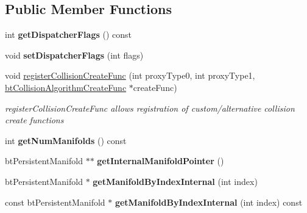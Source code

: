 \subsection*{Public Member Functions}
\begin{DoxyCompactItemize}
\item 
\hypertarget{classbt_collision_dispatcher_a9f91e83776324e63444f32c8907d8270}{int {\bfseries get\+Dispatcher\+Flags} () const }\label{classbt_collision_dispatcher_a9f91e83776324e63444f32c8907d8270}

\item 
\hypertarget{classbt_collision_dispatcher_acf7d7afab71d8ffb37e8c3ed8613eebe}{void {\bfseries set\+Dispatcher\+Flags} (int flags)}\label{classbt_collision_dispatcher_acf7d7afab71d8ffb37e8c3ed8613eebe}

\item 
\hypertarget{classbt_collision_dispatcher_ac754ecadc2116cdf75d63c207937aeac}{void \hyperlink{classbt_collision_dispatcher_ac754ecadc2116cdf75d63c207937aeac}{register\+Collision\+Create\+Func} (int proxy\+Type0, int proxy\+Type1, \hyperlink{structbt_collision_algorithm_create_func}{bt\+Collision\+Algorithm\+Create\+Func} $\ast$create\+Func)}\label{classbt_collision_dispatcher_ac754ecadc2116cdf75d63c207937aeac}

\begin{DoxyCompactList}\small\item\em register\+Collision\+Create\+Func allows registration of custom/alternative collision create functions \end{DoxyCompactList}\item 
\hypertarget{classbt_collision_dispatcher_a565cb90e159a6a47d560e4212e279173}{int {\bfseries get\+Num\+Manifolds} () const }\label{classbt_collision_dispatcher_a565cb90e159a6a47d560e4212e279173}

\item 
\hypertarget{classbt_collision_dispatcher_a9e23bf05bc964dc1089a5f70866dff58}{bt\+Persistent\+Manifold $\ast$$\ast$ {\bfseries get\+Internal\+Manifold\+Pointer} ()}\label{classbt_collision_dispatcher_a9e23bf05bc964dc1089a5f70866dff58}

\item 
\hypertarget{classbt_collision_dispatcher_aed433cc0bfb5b2ff446dcac3091cb321}{bt\+Persistent\+Manifold $\ast$ {\bfseries get\+Manifold\+By\+Index\+Internal} (int index)}\label{classbt_collision_dispatcher_aed433cc0bfb5b2ff446dcac3091cb321}

\item 
\hypertarget{classbt_collision_dispatcher_addccf59e3198f9ea136204b97d6bc85a}{const bt\+Persistent\+Manifold $\ast$ {\bfseries get\+Manifold\+By\+Index\+Internal} (int index) const }\label{classbt_collision_dispatcher_addccf59e3198f9ea136204b97d6bc85a}


\end{DoxyCompactItemize}
